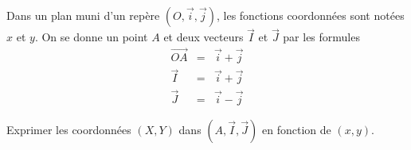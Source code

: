 Dans un plan muni d'un rep\`ere $(O,\overrightarrow{i}, \overrightarrow{j})$, les fonctions coordonn\'ees sont not\'ees $x$ et $y$. On se donne un point $A$ et deux vecteurs $\overrightarrow{I}$ et $\overrightarrow{J}$ par les formules 
\begin{eqnarray*}
\overrightarrow{OA} &=& \overrightarrow{i} + \overrightarrow{j}\\
\overrightarrow{I} &=& \overrightarrow{i} + \overrightarrow{j}\\
\overrightarrow{J} &=& \overrightarrow{i} - \overrightarrow{j}
  \end{eqnarray*}

  Exprimer les coordonn\'ees $(X,Y)$ dans $(A,\overrightarrow{I}, \overrightarrow{J})$ en fonction de $(x,y)$.\bigskip \bigskip